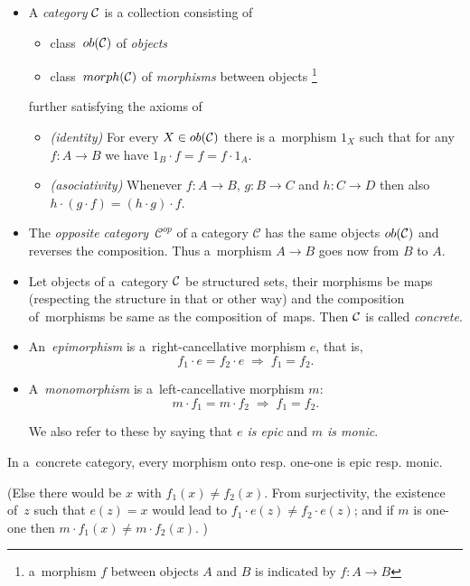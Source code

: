 \begin{itemize}
\item A \emph{category} $\mathcal{C}$ is a collection consisting of
  \begin{itemize}
  \item class~$ob(\mathcal{C})$ of \emph{objects\/}
  \item class~$morph(\mathcal{C})$ of \emph{morphisms\/} between objects\thinspace%
  \footnote{a~morphism $f$ between objects $A$ and $B$ is indicated by $f\colon
    A \to B$}
  \end{itemize}
further satisfying the axioms of
  \begin{itemize}
  \item \emph{(identity)\/}
  For every $X\in ob(\mathcal{C})$ there is a~morphism $1_X$ such that for any
  $f\colon A \to B$ we have $1_B \cdot f = f = f \cdot 1_A$.
  \item \emph{(asociativity)\/}
  Whenever $f\colon A \to B$, $g\colon B \to C$ and $h\colon C \to D$ then also $h
  \cdot (g \cdot f) = (h \cdot g) \cdot f$.
  \end{itemize}

\item The \emph{opposite category}~$\mathcal{C}^{op}$ of a category
$\mathcal{C}$ has the same objects $ob(\mathcal{C})$ and reverses the composition.
Thus a~morphism $A \to B$ goes now from $B$ to $A$.

\item Let objects of a~category $\mathcal{C}$ be structured sets, their morphisms be
maps (respecting the structure in that or other way) and the composition
of~morphisms be same as the composition of~maps.
Then $\mathcal{C}$ is called \emph{concrete\/}.

\item An~\emph{epimorphism} is a~right-cancellative morphism $e$, that is,
\[
  f_1 \cdot e = f_2 \cdot e \; \Longrightarrow \; f_1 = f_2.
\]

\item A~\emph{monomorphism} is a~left-cancellative morphism $m$:
\[
  m \cdot f_1 = m \cdot f_2 \; \Longrightarrow \; f_1 = f_2.
\]

We also refer to these by saying that \emph{$e$ is epic\/} and \emph{$m$ is
monic\/}.
\end{itemize}

\begin{fact} \label{fct:onto->epic}
  In a~concrete category, every morphism onto resp. one-one is epic resp.
  monic.
\end{fact}
(Else there would be $x$ with $f_1(x) \ne f_2(x)$.
 From surjectivity, the existence of~$z$ such that $e(z) = x$ would lead to
 $f_1 \cdot e(z) \ne f_2 \cdot e(z)$;
 and if $m$ is one-one then $m \cdot f_1(x) \ne m \cdot f_2(x)$.
 )

